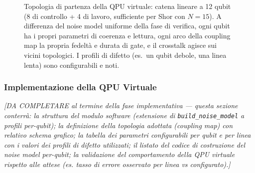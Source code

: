\begin{onehalfspace}
\begin{figure}[H]
\centering
{}
\caption[Topologia della QPU virtuale: catena lineare a 12 qubit con parametri per-qubit]{Topologia di partenza della QPU virtuale: catena lineare a 12 qubit (8 di controllo + 4 di lavoro, sufficiente per Shor con $N=15$). A differenza del noise model uniforme della fase di verifica, ogni qubit ha i propri parametri di coerenza e lettura, ogni arco della coupling map la propria fedeltà e durata di gate, e il crosstalk agisce sui vicini topologici. I profili di difetto (es.\ un qubit debole, una linea lenta) sono configurabili e noti.}
\label{fig:topologia_virtuale}
\end{figure}

\subsubsection{Implementazione della QPU Virtuale}
\label{subsec:impl_qpu}

\textit{[DA COMPLETARE al termine della fase implementativa --- questa sezione conterrà: la struttura del modulo software (estensione di \texttt{build\_noise\_model} a profili per-qubit); la definizione della topologia adottata (coupling map) con relativo schema grafico; la tabella dei parametri configurabili per qubit e per linea con i valori dei profili di difetto utilizzati; il listato del codice di costruzione del noise model per-qubit; la validazione del comportamento della QPU virtuale rispetto alle attese (es. tasso di errore osservato per linea vs configurato).]}


\end{onehalfspace}
